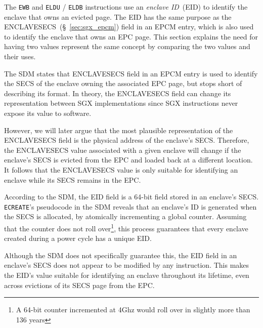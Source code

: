 \label{sec:sgx_eid}

The \texttt{EWB} and \texttt{ELDU} / \texttt{ELDB} instructions use an
\textit{enclave ID}~(EID) to identify the enclave that owns an evicted page.
The EID has the same purpose as the ENCLAVESECS~(\S~\ref{sec:sgx_epcm}) field
in an EPCM entry, which is also used to identify the enclave that owns an EPC
page. This section explains the need for having two values represent the same
concept by comparing the two values and their uses.


The SDM states that ENCLAVESECS field in an EPCM entry is used to identify the
SECS of the enclave owning the associated EPC page, but stops short of
describing its format. In theory, the ENCLAVESECS field can change its
representation between SGX implementations since SGX instructions never expose
its value to software.


However, we will later argue that the most plausible representation of the
ENCLAVESECS field is the physical address of the enclave's SECS. Therefore, the
ENCLAVESECS value associated with a given enclave will change if the enclave's
SECS is evicted from the EPC and loaded back at a different location. It
follows that the ENCLAVESECS value is only suitable for identifying an enclave
while its SECS remains in the EPC.


According to the SDM, the EID field is a 64-bit field stored in an enclave's
SECS. \texttt{ECREATE}'s pseudocode in the SDM reveals that an enclave's ID is
generated when the SECS is allocated, by atomically incrementing a global
counter. Assuming that the counter does not roll over\footnote{A 64-bit counter
incremented at 4Ghz would roll over in slightly more than 136 years}, this
process guarantees that every enclave created during a power cycle has a unique
EID.

Although the SDM does not specifically guarantee this, the EID field in an
enclave's SECS does not appear to be modified by any instruction. This makes
the EID's value suitable for identifying an enclave throughout its lifetime,
even across evictions of its SECS page from the EPC.


\label{sec:sgx_ewb}

